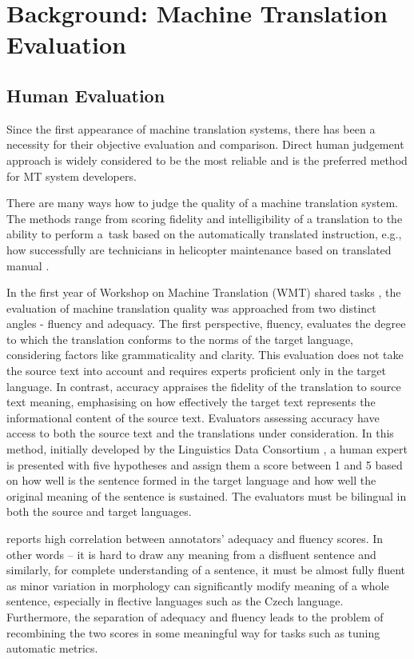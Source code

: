 \chapter{Background: Machine Translation Evaluation}

\section{Human Evaluation}
Since the first appearance of machine translation systems, there has been a necessity for their objective evaluation and comparison. Direct human judgement approach is widely considered to be the most reliable and is the preferred method for MT system developers. 

There are many ways how to judge the quality of a machine translation system. 
The methods range from scoring fidelity and intelligibility of a translation to the ability to perform a~task based on the automatically translated instruction, e.g., how successfully are technicians in  helicopter maintenance based on translated manual \citep{Sinaiko}.

In the first year of Workshop on Machine Translation (WMT) shared tasks \citep{koehn-monz:2006:WMT}, the evaluation of machine translation quality was approached from two distinct angles - fluency and adequacy. The first perspective, fluency, evaluates the degree to which the translation conforms to the norms of the target language, considering factors like grammaticality and clarity. This evaluation does not take the source text into account and requires experts proficient only in the target language. In contrast, accuracy appraises the fidelity of the translation to source text meaning, emphasising on how effectively the target text represents the informational content of the source text. Evaluators assessing accuracy have access to both the source text and the translations under consideration.
In this method, initially  developed by the Linguistics Data Consortium , a human expert is presented with five hypotheses and assign them a score between 1 and 5 based on how well is the sentence formed in the target language and how well the original meaning of the sentence is sustained.
The evaluators must be bilingual in both the source and target languages. 

\cite{callison-burch-etal-2007-meta} reports high correlation between annotators’ adequacy and fluency scores. In other words -- it is hard to draw any meaning from a disfluent sentence and similarly, for complete understanding of a sentence, it must be almost fully fluent as minor variation in morphology can significantly modify meaning of a whole sentence, especially in flective languages such as the Czech language.  Furthermore, the separation of adequacy and fluency leads to the problem of recombining the two scores in some meaningful way for tasks such as tuning automatic metrics. 

